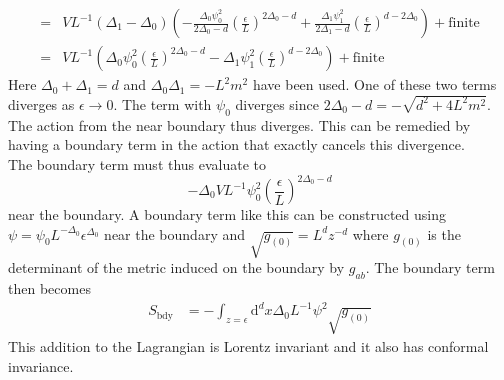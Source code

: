 \documentclass[12pt]{report}
\renewcommand{\d}{\ensuremath{\mathrm{d}}}
\begin{document}
\begin{appendices}
\begin{equation}
\begin{split}
=&VL^{-1}(\Delta_1-\Delta_0)\left(-\frac{ \Delta_0\psi_0^2}{2\Delta_0-d}\left(\frac{\epsilon}{L}\right)^{2\Delta_0-d}+
\frac{\Delta_1 \psi_1^2}{2\Delta_1-d}\left(\frac{\epsilon}{L}\right)^{d-2\Delta_0}\right)+\mathrm{finite}\\
=&VL^{-1}\left(\Delta_0\psi_0^2\left(\frac{\epsilon}{L}\right)^{2\Delta_0-d}-
\Delta_1\psi_1^2\left(\frac{\epsilon}{L}\right)^{d-2\Delta_0}\right)+\mathrm{finite}
\end{split}
\end{equation}
Here $\Delta_0+\Delta_1=d$ and $\Delta_0\Delta_1=-L^2m^2$ have been used. One of these two terms diverges as $\epsilon\rightarrow0$. The term with $\psi_0$ diverges since $2\Delta_0-d=-\sqrt{d^2+4L^2m^2}$. The action from the near boundary thus diverges. This can be remedied by having a boundary term in the action that exactly cancels this divergence.\\
The boundary term must thus evaluate to
\begin{equation}
-\Delta_0VL^{-1}\psi_0^2\left(\frac{\epsilon}{L}\right)^{2\Delta_0-d}
\end{equation}
near the boundary. A boundary term like this can be constructed using $\psi=\psi_0L^{-\Delta_0}\epsilon^{\Delta_0}$ near the boundary and $\sqrt{g_{(0)}}=L^dz^{-d}$ where $g_{(0)}$ is the determinant of the metric induced on the boundary by $g_{ab}$.
The boundary term then becomes
\begin{equation}
\begin{split}
 S_{\mathrm{bdy}}&=-\int_{z=\epsilon}\d^dx\Delta_0L^{-1}\psi^2\sqrt{g_{(0)}}
\label{Sbdy}
\end{split}
\end{equation}
This addition to the Lagrangian is Lorentz invariant and it also has conformal invariance.

\end{appendices}
\end{document}
